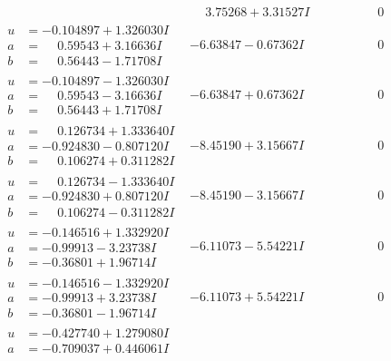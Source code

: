 \documentclass[1p]{elsarticle_modified}
\theoremstyle{definition}
\begin{document}
$$\begin{array}{c|c|c}
 & \phantom{-}3.75268 + 3.31527 I & \phantom{-0.000000 } 0 \\ \hline\begin{aligned}
u &= -0.104897 + 1.326030 I \\
a &= \phantom{-}0.59543 + 3.16636 I \\
b &= \phantom{-}0.56443 - 1.71708 I\end{aligned}
 & -6.63847 - 0.67362 I & \phantom{-0.000000 } 0 \\ \hline\begin{aligned}
u &= -0.104897 - 1.326030 I \\
a &= \phantom{-}0.59543 - 3.16636 I \\
b &= \phantom{-}0.56443 + 1.71708 I\end{aligned}
 & -6.63847 + 0.67362 I & \phantom{-0.000000 } 0 \\ \hline\begin{aligned}
u &= \phantom{-}0.126734 + 1.333640 I \\
a &= -0.924830 - 0.807120 I \\
b &= \phantom{-}0.106274 + 0.311282 I\end{aligned}
 & -8.45190 + 3.15667 I & \phantom{-0.000000 } 0 \\ \hline\begin{aligned}
u &= \phantom{-}0.126734 - 1.333640 I \\
a &= -0.924830 + 0.807120 I \\
b &= \phantom{-}0.106274 - 0.311282 I\end{aligned}
 & -8.45190 - 3.15667 I & \phantom{-0.000000 } 0 \\ \hline\begin{aligned}
u &= -0.146516 + 1.332920 I \\
a &= -0.99913 - 3.23738 I \\
b &= -0.36801 + 1.96714 I\end{aligned}
 & -6.11073 - 5.54221 I & \phantom{-0.000000 } 0 \\ \hline\begin{aligned}
u &= -0.146516 - 1.332920 I \\
a &= -0.99913 + 3.23738 I \\
b &= -0.36801 - 1.96714 I\end{aligned}
 & -6.11073 + 5.54221 I & \phantom{-0.000000 } 0 \\ \hline\begin{aligned}
u &= -0.427740 + 1.279080 I \\
a &= -0.709037 + 0.446061 I \\

\end{aligned}
\end{array}$$
\end{document}

